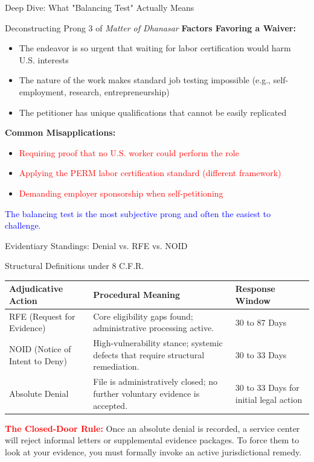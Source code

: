 \documentclass[11pt]{beamer}
\begin{document}
	\begin{frame}{Deep Dive: What "Balancing Test" Actually Means}
		\scriptsize
		\begin{block}{Deconstructing Prong 3 of \textit{Matter of Dhanasar}}
			\textbf{Factors Favoring a Waiver:}
			\begin{itemize}
				\item The endeavor is so urgent that waiting for labor certification would harm U.S. interests
				\item The nature of the work makes standard job testing impossible (e.g., self-employment, research, entrepreneurship)
				\item The petitioner has unique qualifications that cannot be easily replicated
			\end{itemize}
			\textbf{Common Misapplications:}
			\begin{itemize}
				\item \textcolor{red}{Requiring proof that no U.S. worker could perform the role}
				\item \textcolor{red}{Applying the PERM labor certification standard (different framework)}
				\item \textcolor{red}{Demanding employer sponsorship when self-petitioning}
			\end{itemize}
			\textcolor{blue}{The balancing test is the most subjective prong and often the easiest to challenge.}
		\end{block}
	\end{frame}
	
	
	\begin{frame}{Evidentiary Standings: Denial vs. RFE vs. NOID}
		\scriptsize
		\begin{block}{Structural Definitions under 8 C.F.R.}
			\centering
			\begin{tabular}{|p{3cm}|p{5cm}|p{2.5cm}|}
				\hline
				\textbf{Adjudicative Action} & \textbf{Procedural Meaning} & \textbf{Response Window} \\
				\hline
				RFE (Request for Evidence) & Core eligibility gaps found; administrative processing active. & 30 to 87 Days \\
				\hline
				NOID (Notice of Intent to Deny) & High-vulnerability stance; systemic defects that require structural remediation. & 30 to 33 Days \\
				\hline
				Absolute Denial & File is administratively closed; no further voluntary evidence is accepted. & 30 to 33 Days for initial legal action \\
				\hline
			\end{tabular}
			\vspace{0.2cm}
			\flushleft \textcolor{red}{\textbf{The Closed-Door Rule:}} Once an absolute denial is recorded, a service center will reject informal letters or supplemental evidence packages. To force them to look at your evidence, you must formally invoke an active jurisdictional remedy.
		\end{block}
	\end{frame}
	
\end{document}
